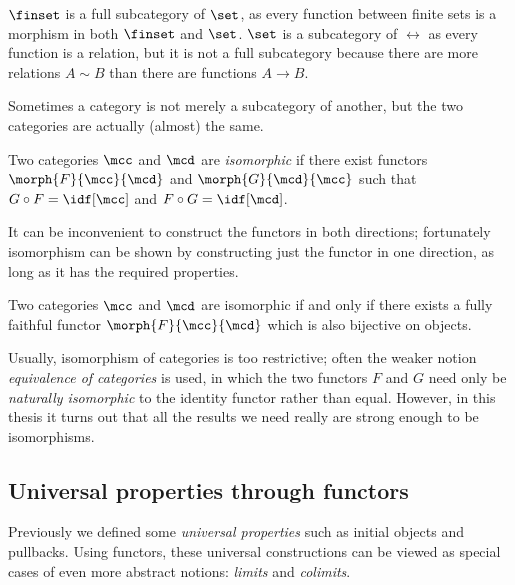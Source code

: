 \begin{example}
    \(\finset\) is a full subcategory of \(\set\), as every function between
    finite sets is a morphism in both \(\finset\) and \(\set\).
    \(\set\) is a subcategory of \(\rel\) as every function is a relation, but
    it is not a full subcategory because there are more relations \(A \sim B\)
    than there are functions \(A \to B\).
\end{example}

Sometimes a category is not merely a subcategory of another, but the two
categories are actually (almost) the same.

\begin{definition}
    Two categories \(\mcc\) and \(\mcd\) are \emph{isomorphic} if there exist
    functors \(\morph{F}{\mcc}{\mcd}\) and \(\morph{G}{\mcd}{\mcc}\) such that
    \(G \circ F = \idf[\mcc]\) and \(F \circ G = \idf[\mcd]\).
\end{definition}

It can be inconvenient to construct the functors in both directions; fortunately
isomorphism can be shown by constructing just the functor in one direction, as
long as it has the required properties.

\begin{lemma}
    Two categories \(\mcc\) and \(\mcd\) are isomorphic if and only if there
    exists a fully faithful functor \(\morph{F}{\mcc}{\mcd}\) which is also
    bijective on objects.
\end{lemma}

\begin{remark}
    Usually, isomorphism of categories is too restrictive; often the weaker
    notion \emph{equivalence of categories} is used, in which the two functors
    \(F\) and \(G\) need only be \emph{naturally isomorphic} to the identity
    functor rather than equal.
    However, in this thesis it turns out that all the results we need really are
    strong enough to be isomorphisms.
\end{remark}


\subsection{Universal properties through functors}

Previously we defined some \emph{universal properties} such as initial
objects and pullbacks.
Using functors, these universal constructions can be viewed as special cases of
even more abstract notions: \emph{limits} and \emph{colimits}.


